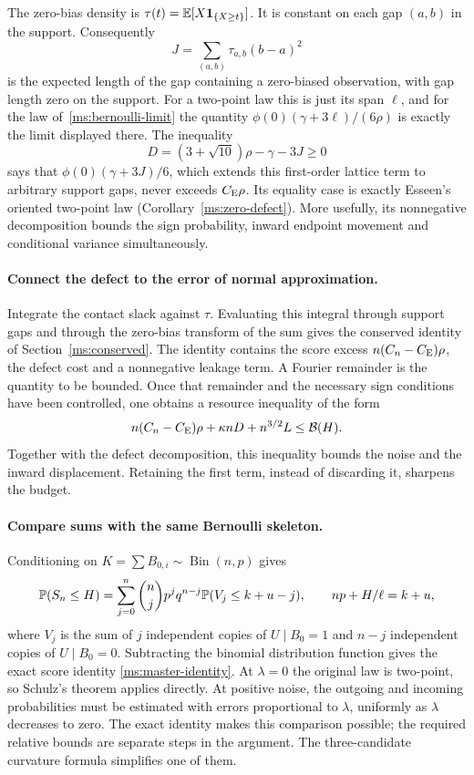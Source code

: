 The zero-bias density is $\tau(t)=\mathbb E[X\mathbf 1_{\{X\ge t\}}]$.
It is constant on each gap $(a,b)$ in the support. Consequently
\[
 J=\sum_{(a,b)}\tau_{a,b}(b-a)^2
\]
is the expected length of the gap containing a zero-biased observation,
with gap length zero on the support. For a two-point law this is just
its span $\ell$, and for the law of~\eqref{ms:bernoulli-limit} the quantity
$\phi(0)(\gamma+3\ell)/(6\rho)$ is exactly the limit displayed there. The
inequality
\[
 D=(3+\sqrt{10})\rho-\gamma-3J\ge0
\]
says that $\phi(0)(\gamma+3J)/6$, which extends this first-order lattice
term to arbitrary support gaps, never exceeds $C_{\mathrm E}\rho$.
Its equality case is exactly Esseen's oriented two-point law
(Corollary~\ref{ms:zero-defect}). More usefully, its nonnegative
 decomposition bounds the sign probability, inward endpoint movement
and conditional variance simultaneously.

\paragraph{Connect the defect to the error of normal approximation.}
Integrate the contact slack against $\tau$. Evaluating this integral
through support gaps and through the zero-bias transform of the sum
gives the conserved identity of Section~\ref{ms:conserved}. The identity
contains the score excess $n(C_n-C_{\mathrm E})\rho$, the defect cost and a
nonnegative leakage term. A Fourier remainder is the quantity to be
bounded. Once that remainder and the necessary sign conditions have
been controlled, one obtains a resource inequality of the form
\[
 n(C_n-C_{\mathrm E})\rho+\kappa nD+n^{3/2}L\le\mathcal B(H).
\]
Together with the defect decomposition, this inequality bounds the noise
and the inward displacement.
Retaining the first term, instead of discarding it, sharpens the budget.

\paragraph{Compare sums with the same Bernoulli skeleton.}
Conditioning on $K=\sum B_{0,i}\sim\operatorname{Bin}(n,p)$ gives
\[
 \mathbb P(S_n\le H)=\sum_{j=0}^n\binom njp^jq^{n-j}
                   \mathbb P(V_j\le k+u-j),
 \qquad np+H/\ell=k+u,
\]
where $V_j$ is the sum of $j$ independent copies of $U\mid B_0=1$
and $n-j$ independent copies of $U\mid B_0=0$. Subtracting
the binomial distribution function gives the exact score identity
\eqref{ms:master-identity}. At $\lambda=0$ the original law is two-point,
so Schulz's theorem applies directly. At positive noise, the outgoing
and incoming probabilities must be estimated with errors proportional
to $\lambda$, uniformly as $\lambda$ decreases to zero. The exact identity
makes this comparison possible; the required relative bounds are separate
steps in the argument. The three-candidate curvature formula simplifies
one of them.


